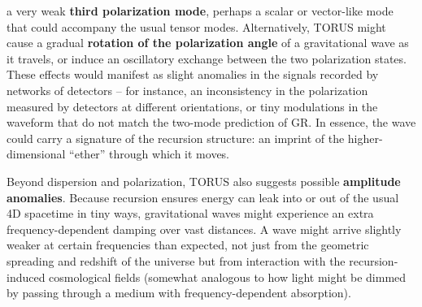 \documentclass[
]{article}
\begin{document}
\begin{itemize}
  a very weak \textbf{third polarization mode}, perhaps a scalar or
  vector-like mode that could accompany the usual tensor
  modes\hspace{0pt}. Alternatively, TORUS might cause a gradual
  \textbf{rotation of the polarization angle} of a gravitational wave as
  it travels, or induce an oscillatory exchange between the two
  polarization states. These effects would manifest as slight anomalies
  in the signals recorded by networks of detectors -- for instance, an
  inconsistency in the polarization measured by detectors at different
  orientations, or tiny modulations in the waveform that do not match
  the two-mode prediction of GR. In essence, the wave could carry a
  signature of the recursion structure: an imprint of the
  higher-dimensional ``ether'' through which it moves.
\end{itemize}

Beyond dispersion and polarization, TORUS also suggests possible
\textbf{amplitude anomalies}. Because recursion ensures energy can leak
into or out of the usual 4D spacetime in tiny ways, gravitational waves
might experience an extra frequency-dependent damping over vast
distances\hspace{0pt}. A wave might arrive slightly weaker at certain
frequencies than expected, not just from the geometric spreading and
redshift of the universe but from interaction with the recursion-induced
cosmological fields (somewhat analogous to how light might be dimmed by
passing through a medium with frequency-dependent absorption).
\end{document}

